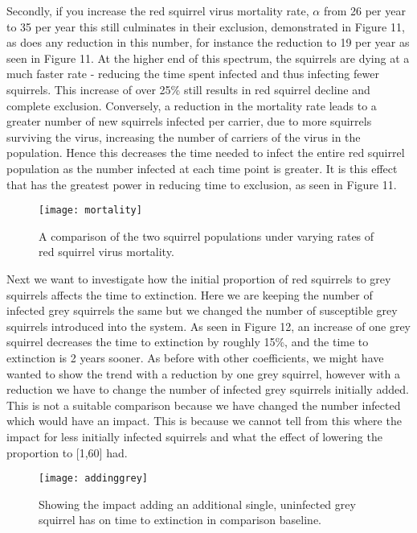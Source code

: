 \documentclass{article}
\begin{document}
Secondly, if you increase the red squirrel virus mortality rate, $\alpha$ from 26 per year to 35 per year this still culminates in their exclusion, demonstrated in Figure 11, as does any reduction in this number, for instance the reduction to 19 per year as seen in Figure 11. At the higher end of this spectrum, the squirrels are dying at a much faster rate - reducing the time spent infected and thus infecting fewer squirrels. This increase of over 25\% still results in red squirrel decline and complete exclusion. Conversely, a reduction in the mortality rate leads to a greater number of new squirrels infected per carrier, due to more squirrels surviving the virus, increasing the number of carriers of the virus in the population. Hence this decreases the time needed to infect the entire red squirrel population as the number infected at each time point is greater. It is this effect that has the greatest power in reducing time to exclusion, as seen in Figure 11.

\begin{figure}[H]
\begin{center}
\texttt{[image: mortality]}
\caption{A comparison of the two squirrel populations under varying rates of red squirrel virus mortality. }
\end{center}
\end{figure}

Next we want to investigate how the initial proportion of red squirrels to grey squirrels affects the time to extinction. Here we are keeping the number of infected grey squirrels the same but we changed the number of susceptible grey squirrels introduced into the system. As seen in Figure 12, an increase of one grey squirrel decreases the time to extinction by roughly 15\%, and the time to extinction is 2 years sooner. As before with other coefficients, we might have wanted to show the trend with a reduction by one grey squirrel, however with a reduction we have to change the number of infected grey squirrels initially added. This is not a suitable comparison because we have changed the number infected which would have an impact. This is because we cannot tell from this where the impact for less initially infected squirrels and what the effect of lowering the proportion to [1,60] had. 

\begin{figure}[H]
\begin{center}
\texttt{[image: addinggrey]}
\caption{Showing the impact adding an additional single, uninfected grey squirrel has on time to extinction in comparison baseline.}
\end{center}
\end{figure}
\end{document}
